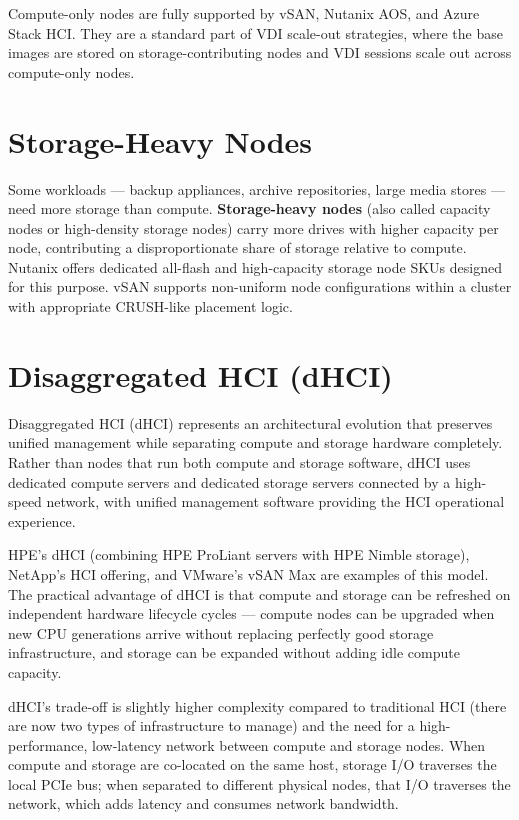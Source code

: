 Compute-only nodes are fully supported by vSAN, Nutanix AOS, and Azure Stack HCI. They are a standard part of VDI scale-out strategies, where the base images are stored on storage-contributing nodes and VDI sessions scale out across compute-only nodes.

\section{Storage-Heavy Nodes}
Some workloads --- backup appliances, archive repositories, large media stores --- need more storage than compute. \textbf{Storage-heavy nodes} (also called capacity nodes or high-density storage nodes) carry more drives with higher capacity per node, contributing a disproportionate share of storage relative to compute. Nutanix offers dedicated all-flash and high-capacity storage node SKUs designed for this purpose. vSAN supports non-uniform node configurations within a cluster with appropriate CRUSH-like placement logic.

\section{Disaggregated HCI (dHCI)}
Disaggregated HCI (dHCI) represents an architectural evolution that preserves unified management while separating compute and storage hardware completely. Rather than nodes that run both compute and storage software, dHCI uses dedicated compute servers and dedicated storage servers connected by a high-speed network, with unified management software providing the HCI operational experience.

HPE's dHCI (combining HPE ProLiant servers with HPE Nimble storage), NetApp's HCI offering, and VMware's vSAN Max are examples of this model. The practical advantage of dHCI is that compute and storage can be refreshed on independent hardware lifecycle cycles --- compute nodes can be upgraded when new CPU generations arrive without replacing perfectly good storage infrastructure, and storage can be expanded without adding idle compute capacity.

dHCI's trade-off is slightly higher complexity compared to traditional HCI (there are now two types of infrastructure to manage) and the need for a high-performance, low-latency network between compute and storage nodes. When compute and storage are co-located on the same host, storage I/O traverses the local PCIe bus; when separated to different physical nodes, that I/O traverses the network, which adds latency and consumes network bandwidth.

